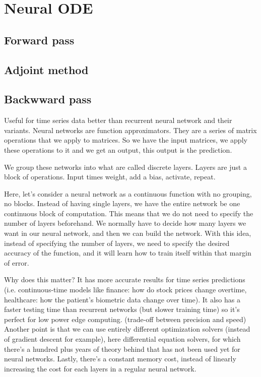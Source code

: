 \documentclass[10pt,a4paper]{article}
\theoremstyle{definition}
\theoremstyle{theorem}
\begin{document}
\section{Neural ODE}


\subsection{Forward pass}

\subsection{Adjoint method}
 
\subsection{Backwward pass}












Useful for time series data better than recurrent neural network and their variants. 
Neural networks are function approximators. They are a series of matrix operations that we apply to matrices. So we have the input matrices, we apply these operations to it and we get an output, this output is the prediction. 

We group these networks into what are called discrete layers. Layers are just a block of operations.
Input times weight, add a bias, activate, repeat.

Here, let's consider a neural network as a continuous function with no grouping, no blocks. Instead of having single layers, we have the entire network be one continuous block of computation. This means that we do not need to specify the number of layers beforehand. We normally have to decide how many layers we want in our neural network, and then we can build the network. With this idea, instead of specifying the number of layers, we need to specify the desired accuracy of the function, and it will learn how to train itself within that margin of error. 

Why does this matter?  It has more accurate results for time series predictions (i.e. continuous-time models like finance: how do stock prices change overtime, healthcare: how the patient's biometric data change over time). It also has a faster testing time than recurrent networks (but slower training time) so it's perfect for low power edge computing. (trade-off between precision and speed) Another point is that we can use entirely different optimization solvers (instead of gradient descent for example), here differential equation solvers, for which there's a hundred plus years of theory behind that has not been used yet for neural networks. Lastly, there's a constant memory cost, instead of linearly increasing the cost for each layers in a regular neural network. 
\end{document}
